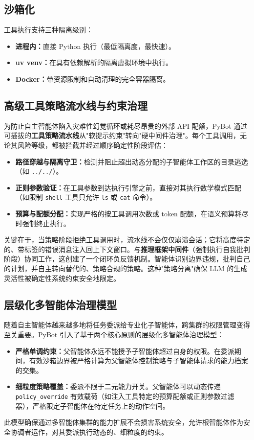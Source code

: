 \documentclass[11pt,a4paper]{article}
\begin{document}
\subsection{沙箱化}

工具执行支持三种隔离级别：
\begin{itemize}
  \item \textbf{进程内：}直接 Python 执行（最低隔离度，最快速）。
  \item \textbf{uv venv：}在具有依赖解析的隔离虚拟环境中执行。
  \item \textbf{Docker：}带资源限制和自动清理的完全容器隔离。
\end{itemize}

\subsection{高级工具策略流水线与约束治理}

为防止自主智能体陷入灾难性幻觉循环或耗尽昂贵的外部 API 配额，PyBot 通过可插拔的\textbf{工具策略流水线}从"软提示约束"转向"硬中间件治理"。每个工具调用，无论其风险等级，都被拦截并经过顺序确定性阶段评估：
\begin{itemize}
  \item \textbf{路径穿越与隔离守卫：}检测并阻止超出动态分配的子智能体工作区的目录逃逸（如 \texttt{../../}）。
  \item \textbf{正则参数验证：}在工具参数到达执行引擎之前，直接对其执行数学模式匹配（如限制 \texttt{shell} 工具只允许 \texttt{ls} 或 \texttt{cat} 命令）。
  \item \textbf{预算与配额分配：}实现严格的按工具调用次数或 token 配额，在语义预算耗尽时强制终止执行。
\end{itemize}
关键在于，当策略阶段拒绝工具调用时，流水线不会仅仅崩溃会话；它将高度特定的、带标签的错误消息注入回上下文窗口。与\textbf{推理框架中间件}（强制执行自我批判阶段）协同工作，这创建了一个闭环负反馈机制。智能体识别边界违规，批判自己的计划，并自主转向替代的、策略合规的策略。这种"策略分离"确保 LLM 的生成灵活性被确定性系统约束安全地限定。


\subsection{层级化多智能体治理模型}

随着自主智能体越来越多地将任务委派给专业化子智能体，跨集群的权限管理变得至关重要。PyBot 引入了基于两个核心原则的层级化多智能体治理模型：
\begin{itemize}
  \item \textbf{严格单调约束：}父智能体永远不能授予子智能体超过自身的权限。在委派期间，有效沙箱边界被严格计算为父智能体控制策略与子智能体请求的能力档案的交集。
  \item \textbf{细粒度策略覆盖：}委派不限于二元能力开关。父智能体可以动态传递 \texttt{policy\_override} 有效载荷（如注入工具特定的预算配额或正则参数过滤器），严格限定子智能体在特定任务上的动作空间。
\end{itemize}
此模型确保通过多智能体集群的能力扩展不会损害系统安全，允许根智能体作为安全协调者运作，对其委派执行动态的、细粒度的约束。
\end{document}

